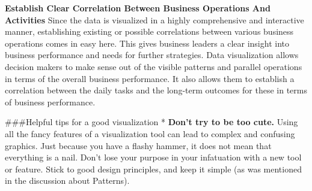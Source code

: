\documentclass[]{book}
\begin{document}
\textbf{Establish Clear Correlation Between Business Operations And Activities}
Since the data is visualized in a highly comprehensive and interactive manner, establishing existing or possible correlations between various business operations comes in easy here. This gives business leaders a clear insight into business performance and needs for further strategies.
Data visualization allows decision makers to make sense out of the visible patterns and parallel operations in terms of the overall business performance. It also allows them to establish a correlation between the daily tasks and the long-term outcomes for these in terms of business performance.

\#\#\#Helpful tips for a good visualization
* \textbf{Don't try to be too cute.} Using all the fancy features of a visualization tool can lead to complex and confusing graphics. Just because you have a flashy hammer, it does not mean that everything is a nail. Don't lose your purpose in your infatuation with a new tool or feature. Stick to good design principles, and keep it simple (as was mentioned in the discussion about Patterns).
\end{document}
